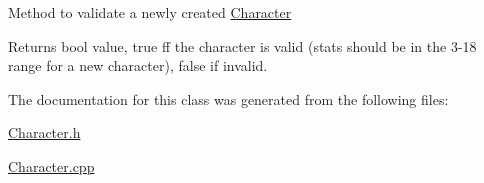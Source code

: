 Method to validate a newly created \hyperlink{class_character}{Character} \begin{DoxyReturn}{Returns}
bool value, true ff the character is valid (stats should be in the 3-\/18 range for a new character), false if invalid. 
\end{DoxyReturn}


The documentation for this class was generated from the following files\+:\begin{DoxyCompactItemize}
\item 
\hyperlink{_character_8h}{Character.\+h}\item 
\hyperlink{_character_8cpp}{Character.\+cpp}\end{DoxyCompactItemize}
